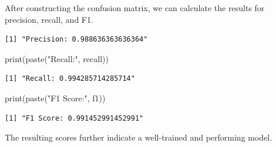 \documentclass[
  letterpaper,
]{krantz}
\newenvironment{Shaded}{\begin{snugshade}}{\end{snugshade}}
\newcommand{\DecValTok}[1]{\textcolor[rgb]{0.68,0.00,0.00}{#1}}
\newcommand{\FunctionTok}[1]{\textcolor[rgb]{0.28,0.35,0.67}{#1}}
\newcommand{\NormalTok}[1]{\textcolor[rgb]{0.00,0.23,0.31}{#1}}
\newcommand{\OtherTok}[1]{\textcolor[rgb]{0.00,0.23,0.31}{#1}}
\newcommand{\SpecialCharTok}[1]{\textcolor[rgb]{0.37,0.37,0.37}{#1}}
\newcommand{\StringTok}[1]{\textcolor[rgb]{0.13,0.47,0.30}{#1}}
\begin{document}
\begin{tcolorbox}
After constructing the confusion matrix, we can calculate the results
for precision, recall, and F1.

\begin{Shaded}
\end{Shaded}

\begin{verbatim}
[1] "Precision: 0.988636363636364"
\end{verbatim}

\begin{Shaded}
\begin{Highlighting}[]
\FunctionTok{print}\NormalTok{(}\FunctionTok{paste}\NormalTok{(}\StringTok{"Recall:"}\NormalTok{, recall))}
\end{Highlighting}
\end{Shaded}

\begin{verbatim}
[1] "Recall: 0.994285714285714"
\end{verbatim}

\begin{Shaded}
\begin{Highlighting}[]
\FunctionTok{print}\NormalTok{(}\FunctionTok{paste}\NormalTok{(}\StringTok{"F1 Score:"}\NormalTok{, f1))}
\end{Highlighting}
\end{Shaded}

\begin{verbatim}
[1] "F1 Score: 0.991452991452991"
\end{verbatim}

The resulting scores further indicate a well-trained and performing
model.


\end{tcolorbox}
\end{document}
